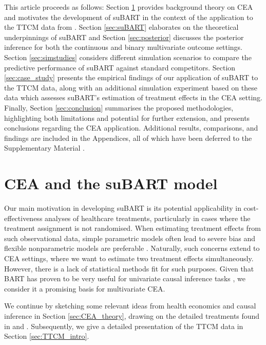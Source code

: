 \documentclass[aoas,preprint]{imsart}
\theoremstyle{plain}
\theoremstyle{definition}
\theoremstyle{remark}
\begin{document}
This article proceeds as follows: Section \ref{sec:application} provides background theory on CEA and motivates the development of suBART in the context of the application to the TTCM data from \citet{wiertsema2019cost}. Section \ref{sec:suBART}  elaborates on the theoretical underpinnings of suBART and Section \ref{sec:posterior} discusses the posterior inference for both the continuous and  binary multivariate outcome settings. Section \ref{sec:simstudies} considers different simulation scenarios to compare the predictive performance of suBART against standard competitors. Section \ref{sec:case_study} presents the empirical findings of our application of suBART to the TTCM data, along with an additional simulation experiment based on these data which assesses suBART's estimation of treatment effects in the CEA setting. Finally, Section \ref{sec:conclusion} summarises the proposed methodologies, highlighting both 
limitations and potential for further extension, and presents conclusions regarding the CEA application. Additional results, comparisons, and findings are included in the Appendices, all of which have been deferred to the Supplementary Material \citep{EsserMaiaSupplement}.

\section{CEA and the suBART model}\label{sec:application}

Our main motivation in developing suBART is its potential applicability in cost-effectiveness analyses of healthcare treatments, particularly in cases where the treatment assignment is not randomised. When estimating treatment effects from such observational data, simple parametric models often lead to severe bias and flexible nonparametric models are preferable \citep{hernan2024causal}. 
Naturally, such concerns extend to CEA settings, where we want to estimate two treatment effects simultaneously. However, there is a lack of statistical methods fit for such purposes. Given that BART has proven to be very useful for univariate causal inference tasks \citep{hill2011bayesian,dorie2019automated,rudolph2023all}, we consider it a promising basis for multivariate CEA.

We continue by sketching some relevant ideas from health economics and causal inference in Section \ref{sec:CEA_theory}, drawing on the detailed treatments found in \citet{gabrio2019bayesian} and \citet{li2023bayesian}. Subsequently, we give a detailed presentation of the TTCM data in Section \ref{sec:TTCM_intro}.
\end{document}
